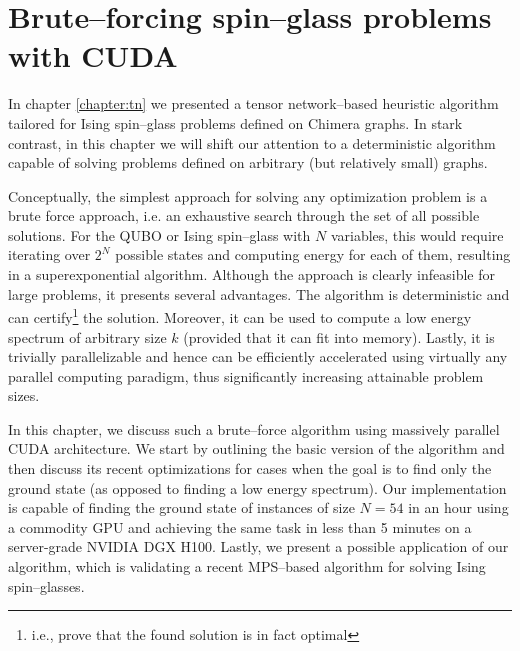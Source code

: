 \chapter{Brute--forcing spin--glass problems with CUDA}
\label{chapter:bruteforce}
In chapter \ref{chapter:tn} we presented a tensor network--based heuristic algorithm
tailored for Ising spin--glass problems defined on Chimera graphs. In stark contrast, in this
chapter we will shift our attention to a deterministic algorithm capable of solving problems defined
on arbitrary (but relatively small) graphs.

Conceptually, the simplest approach for solving any optimization problem is a
brute force approach, i.e. an exhaustive search through the set of all possible
solutions. For the QUBO or Ising spin--glass with $N$ variables, this would
require iterating over $2^{N}$ possible states and computing energy for each of
them, resulting in a superexponential algorithm. Although the approach is
clearly infeasible for large problems, it presents several advantages. The
algorithm is deterministic and can certify\footnote{i.e., prove that the found
  solution is in fact optimal} the solution. Moreover, it can be used to compute
a low energy spectrum of arbitrary size $k$ (provided that it can fit into
memory). Lastly, it is trivially parallelizable and hence can be efficiently
accelerated using virtually any parallel computing paradigm, thus significantly
increasing attainable problem sizes.

In this chapter, we discuss such a brute--force algorithm using massively
parallel CUDA architecture. We start by outlining the basic version of the
algorithm and then discuss its recent optimizations for cases when the goal is
to find only the ground state (as opposed to finding a low energy spectrum).
Our implementation is capable of finding the ground state of instances of size
$N=54$ in an hour using a commodity GPU and achieving the same task in less
than 5 minutes on a server-grade NVIDIA DGX H100. Lastly, we present a possible
application of our algorithm, which is validating a recent MPS--based algorithm
for solving Ising spin--glasses.


